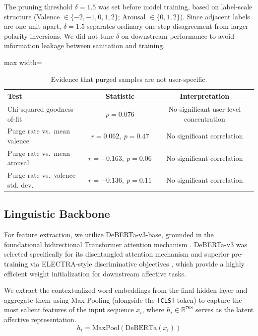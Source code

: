 \documentclass[11pt, a4paper]{article}
\begin{document}
The pruning threshold $\delta=1.5$ was set before model training, based on label-scale structure (Valence $\in \{-2,-1,0,1,2\}$; Arousal $\in \{0,1,2\}$). Since adjacent labels are one unit apart, $\delta=1.5$ separates ordinary one-step disagreement from larger polarity inversions. We did not tune $\delta$ on downstream performance to avoid information leakage between sanitation and training.

\begin{table}[h]
\centering
\Large
\setlength{\tabcolsep}{8pt}
\renewcommand{\arraystretch}{1.2}
\begin{adjustbox}{max width=\columnwidth}
\begin{tabular}{lcc}
\toprule
\textbf{Test} & \textbf{Statistic} & \textbf{Interpretation} \\
\midrule
Chi-squared goodness-of-fit & $p=0.076$ & No significant user-level concentration \\
Purge rate vs.\ mean valence & $r=0.062,\ p=0.47$ & No significant correlation \\
Purge rate vs.\ mean arousal & $r=-0.163,\ p=0.06$ & No significant correlation \\
Purge rate vs.\ valence std. dev. & $r=-0.136,\ p=0.11$ & No significant correlation \\
\bottomrule
\end{tabular}
\end{adjustbox}
\caption{Evidence that purged samples are not user-specific.}
\label{tab:purge_distribution}
\end{table}

\subsection{Linguistic Backbone}
For feature extraction, we utilize DeBERTa-v3-base, grounded in the foundational bidirectional Transformer attention mechanism \citep{vaswani2017attention}. DeBERTa-v3 was selected specifically for its disentangled attention mechanism and superior pre-training via ELECTRA-style discriminative objectives \citep{clark2020electra}, which provide a highly efficient weight initialization for downstream affective tasks. 

We extract the contextualized word embeddings from the final hidden layer and aggregate them using Max-Pooling (alongside the \texttt{[CLS]} token) to capture the most salient features of the input sequence $x_i$, where $h_i \in \mathbb{R}^{768}$ serves as the latent affective representation.
\begin{equation}
    h_i = \text{MaxPool}(\text{DeBERTa}(x_i))
\end{equation}
\end{document}
